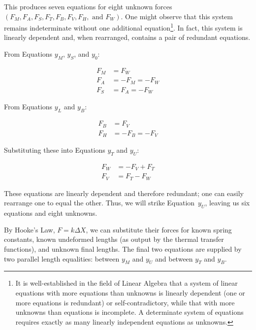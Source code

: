 \documentclass[12pt, letterpaper]{report}%
\newcounter{mycounter}           %
\newcounter{sub}[mycounter]      %
\begin{document}
\begin{appendices}
			This produces seven equations for eight unknown forces $(F_M, F_A, F_S, F_T, F_B, F_V, F_H, \text{ and } F_W)$.
			One might observe that this system remains indeterminate without one additional equation\footnote{It is well-established in the field of Linear Algebra that a system of linear equations with more equations than unknowns is linearly dependent (one or more equations is redundant) or self-contradictory, while that with more unknowns than equations is incomplete. A determinate system of equations requires exactly as many linearly independent equations as unknowns\cite{ref_Anton}.}.
			In fact, this system is linearly dependent and, when rearranged, contains a pair of redundant equations.

			From Equations $y_M$, $y_S$, and $y_0$:

			\begin{align*}
				F_M &= F_W \\
				F_A &= -F_M = -F_W \\
				F_S &= F_A = -F_W
			\end{align*}

			From Equations $y_L$ and $y_B$:

			\begin{align*}
				F_B &= F_V \\
				F_H &= -F_B = -F_V
			\end{align*}

			Substituting these into Equations $y_T$ and $y_U$:

			\begin{align*}
				F_W &= -F_V + F_T \\
				F_V &= F_T - F_W
			\end{align*}

			These equations are linearly dependent and therefore redundant; one can easily rearrange one to equal the other. Thus, we will strike Equation~$y_U$, leaving us six equations and eight unknowns.

			By Hooke's Law\cite{ref_Young_Freedman}, $F = k \Delta X$, we can substitute their forces for known spring constants, known undeformed lengths (as output by the thermal transfer functions), and unknown final lengths.
			The final two equations are supplied by two parallel length equalities: between $y_M$ and $y_U$ and between $y_T$ and $y_B$.


\end{appendices}
\end{document}
